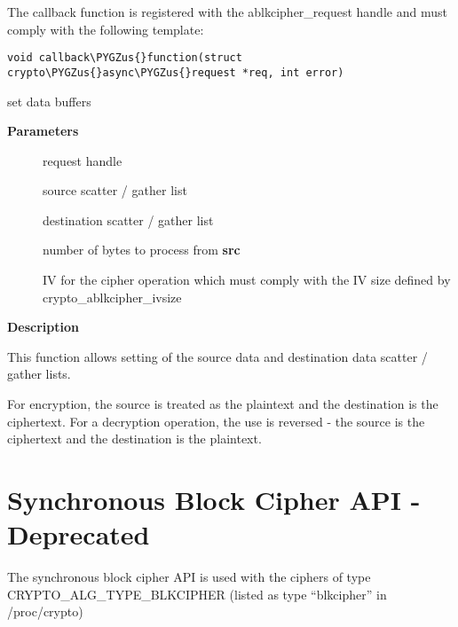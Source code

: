 \documentclass[a4paper,8pt,english]{sphinxmanual}
\def\PYGZus{\char`\_}
\begin{document}
The callback function is registered with the ablkcipher\_request handle and
must comply with the following template:

\begin{Verbatim}[commandchars=\\\{\}]
void callback\PYGZus{}function(struct crypto\PYGZus{}async\PYGZus{}request *req, int error)
\end{Verbatim}

\begin{fulllineitems}
\label{crypto/api-skcipher:c.ablkcipher_request_set_crypt}
set data buffers

\end{fulllineitems}


\textbf{Parameters}
\begin{description}
\item[{}] \leavevmode
request handle

\item[{}] \leavevmode
source scatter / gather list

\item[{}] \leavevmode
destination scatter / gather list

\item[{}] \leavevmode
number of bytes to process from \textbf{src}

\item[{}] \leavevmode
IV for the cipher operation which must comply with the IV size defined
by crypto\_ablkcipher\_ivsize

\end{description}

\textbf{Description}

This function allows setting of the source data and destination data
scatter / gather lists.

For encryption, the source is treated as the plaintext and the
destination is the ciphertext. For a decryption operation, the use is
reversed - the source is the ciphertext and the destination is the plaintext.


\section{Synchronous Block Cipher API - Deprecated}
\label{crypto/api-skcipher:synchronous-block-cipher-api-deprecated}
The synchronous block cipher API is used with the ciphers of type
CRYPTO\_ALG\_TYPE\_BLKCIPHER (listed as type ``blkcipher'' in /proc/crypto)
\end{document}
